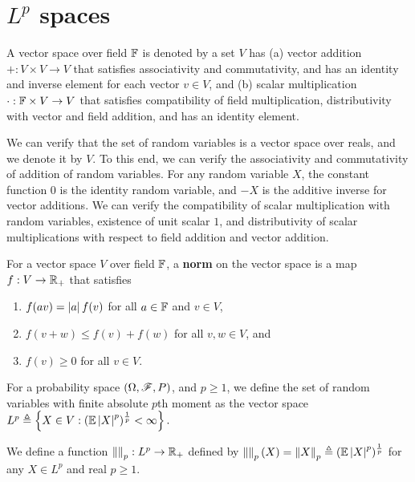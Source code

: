 \documentclass[letterpaper,10pt,english]{article}
\begin{document}
\section{$L^p$ spaces}
\begin{defn}
A vector space over field $\mathbb{F}$ is denoted by a set $V$ has (a) vector addition $+: V\times V\to V$ that satisfies associativity and commutativity, and has an identity and inverse element for each vector $v\in V$, and (b) scalar multiplication $\cdot: \mathbb{F} \times V \to V$ that satisfies compatibility of field multiplication, distributivity with vector and field addition, and has an identity element. 
\end{defn}
\begin{rem} 
We can verify that the set of random variables is a vector space over reals, and we denote it by $V$. 
To this end, we can verify the associativity and commutativity of addition of random variables. 
For any random variable $X$, the constant function $0$ is the identity random variable, and $-X$ is the additive inverse for vector additions.  
We can verify the compatibility of scalar multiplication with random variables, 
existence of unit scalar $1$, and distributivity of scalar multiplications with respect to field addition and vector addition.  
\end{rem}
\begin{defn} 
For a vector space $V$ over field $\mathbb{F}$, a \textbf{norm} on the vector space is a map $f: V \to \mathbb{R}_+$ 
that satisfies  
\begin{enumerate}
	\item [\textbf{homogeneity:}] $f(av) = \left\lvert a\right\rvert f(v)$ for all $a \in \mathbb{F}$ and $v \in V$,
	\item [\textbf{sub-additivity:}] $f(v+w) \le f(v) + f(w)$ for all $v,w \in V$, and 
	\item [\textbf{point-separating:}] $f(v) \ge 0$ for all $v \in V$. 
\end{enumerate}
\end{defn}
\begin{defn}
For a probability space $(\Omega,\mathscr{F},P)$, and $p \ge 1$, 
we define the set of random variables with finite absolute $p$th moment as the vector space  
$
L^p \triangleq \left\{X \in V:(\mathbb{E}\left\lvert X\right\rvert^p)^{\frac{1}{p}} < \infty\right\}. 
$
\end{defn}
\begin{defn}
We define a function $\left\lVert\right\rVert_p: L^p \to \mathbb{R}_+$ defined by $\left\lVert\right\rVert_p(X) = \left\lVert X\right\rVert_p \triangleq (\mathbb{E}\left\lvert X\right\rvert^p)^{\frac{1}{p}}$ for any $X \in L^p$ and real $p \ge 1$. 
\end{defn}
\end{document}
